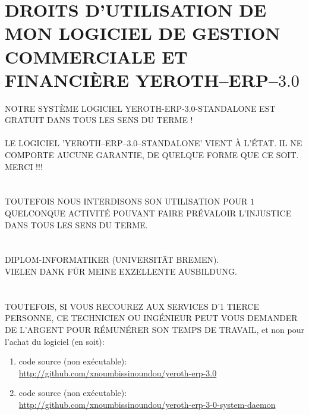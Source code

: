 \chapter{DROITS D'UTILISATION DE MON LOGICIEL DE GESTION 
  COMMERCIALE ET FINANCI\`ERE YEROTH--ERP--$3.0$}


\textcolor{yerothColorRed}{NOTRE SYST\`EME LOGICIEL
YEROTH-ERP-3.0-STANDALONE EST GRATUIT DANS TOUS LES
SENS DU TERME !\\
\\
LE LOGICIEL 'YEROTH--ERP--3.0--STANDALONE' VIENT À
L'ÉTAT. IL NE COMPORTE AUCUNE GARANTIE, DE QUELQUE
FORME QUE CE SOIT.
\\
MERCI !!!\\
\\
\\
TOUTEFOIS NOUS INTERDISONS SON UTILISATION POUR
$1$ QUELCONQUE ACTIVIT\'E POUVANT FAIRE PR\'EVALOIR
L'INJUSTICE DANS TOUS LES SENS DU TERME.\\
\\
\\
DIPLOM-INFORMATIKER (UNIVERSITÄT BREMEN).\\
VIELEN DANK FÜR MEINE EXZELLENTE AUSBILDUNG}.\\
\\
\\
TOUTEFOIS, SI VOUS RECOUREZ AUX SERVICES D'1 TIERCE
PERSONNE, CE TECHNICIEN OU ING\'ENIEUR PEUT VOUS
DEMANDER DE L'ARGENT POUR R\'EMUN\'ERER SON TEMPS DE
TRAVAIL, et non pour l'achat du logiciel (en soit):

\begin{enumerate}[1.]
	\item code source (non ex\'ecutable): \\
		{\small \url{http://github.com/xnoumbissinoundou/yeroth-erp-3.0}}
		
	\item code source (non ex\'ecutable): \\
		{\small \url{http://github.com/xnoumbissinoundou/yeroth-erp-3-0-system-daemon}}
\end{enumerate}



\newpage

